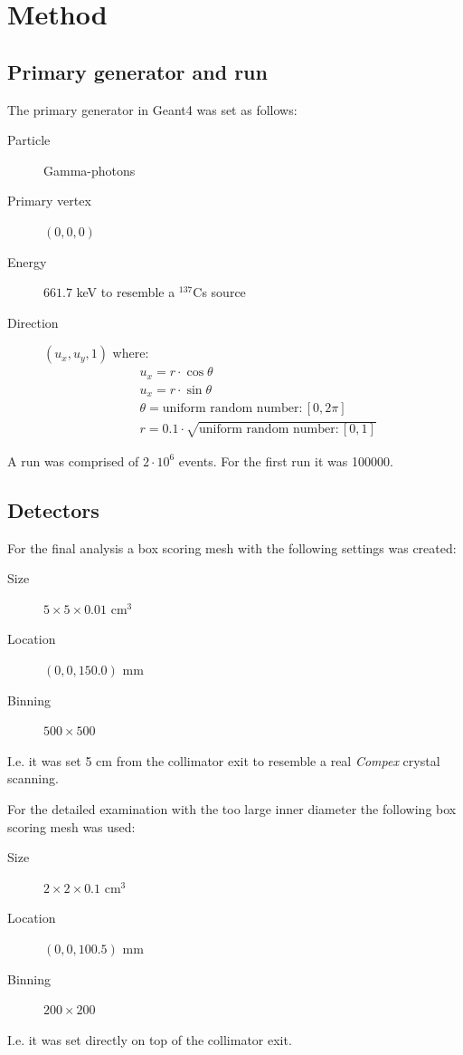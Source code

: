 \documentclass[a4paper]{article}
\begin{document}
\section{Method}
\subsection{Primary generator and run}
The primary generator in Geant4 was set as follows:
\begin{description}
  \item[Particle] Gamma-photons
  \item[Primary vertex] $(0,0,0)$
  \item[Energy] $661.7$ keV to resemble a $^{137}$Cs source
  \item[Direction] $(u_x, u_y, 1)$ where:
  \begin{align}
    &u_x = r \cdot \cos \theta \\
    &u_x = r \cdot \sin \theta \\
    &\theta = \text{uniform random number}: [0, 2\pi] \\
    &r = 0.1 \cdot \sqrt{\text{uniform random number}: [0, 1]}
    \label{eq:GDir}
  \end{align}
\end{description}
A run was comprised of $2\cdot 10^6$ events. For the first run it was 100000.

\subsection{Detectors}
For the final analysis a box scoring mesh with the following settings was created:
\begin{description}
  \item[Size] $5\times5\times0.01$ cm$^3$
  \item[Location] $(0, 0, 150.0)$ mm
  \item[Binning] $500\times500$
\end{description}
I.e. it was set 5 cm from the collimator exit to resemble a real \textit{Compex} crystal scanning.

For the detailed examination with the too large inner diameter the following box scoring mesh was used:
\begin{description}
  \item[Size] $2\times2\times0.1$ cm$^3$
  \item[Location] $(0, 0, 100.5)$ mm
  \item[Binning] $200\times200$
\end{description}
I.e. it was set directly on top of the collimator exit.
\end{document}
